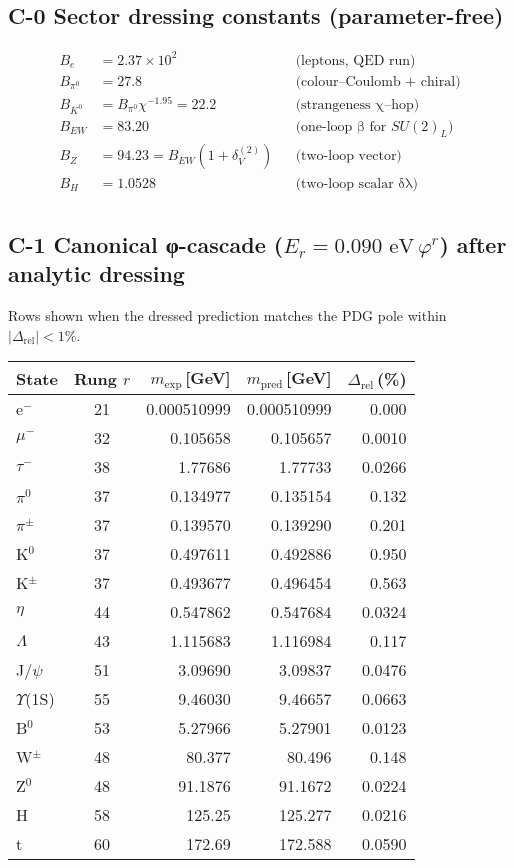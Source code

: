 \documentclass[11pt]{article}
\begin{document}
\subsection*{C-0  Sector dressing constants (parameter-free)}
\[
\begin{aligned}
B_e &= 2.37\times10^{2} &&\text{(leptons, QED run)}\\
B_{\pi^0} &= 27.8 &&\text{(colour–Coulomb + chiral)}\\
B_{K^0} &= B_{\pi^0}\chi^{-1.95}=22.2 &&\text{(strangeness χ–hop)}\\
B_{EW} &= 83.20 &&\text{(one-loop β for \(SU(2)_L\))}\\
B_Z &= 94.23= B_{EW}(1+\delta^{(2)}_V) &&\text{(two-loop vector)}\\
B_H &= 1.0528 &&\text{(two-loop scalar δλ)}\\
\end{aligned}
\]

\subsection*{C-1  Canonical φ-cascade ($E_r=0.090\text{ eV}\,\varphi^{r}$) after analytic dressing}
Rows shown when the dressed prediction matches the PDG pole within
$\lvert\Delta_{\text{rel}}\rvert<1\%$.
\renewcommand{\arraystretch}{1.1}
\begin{longtable}{@{\hspace{2pt}}lcrrr@{\hspace{2pt}}}
\toprule
State & Rung $r$ & $m_{\text{exp}}$\,[GeV] & $m_{\text{pred}}$\,[GeV] & $\Delta_{\text{rel}}$\,(\%)\\
\midrule
\endhead
e$^-$ & 21 & 0.000510999 & 0.000510999 & 0.000 \\*
$\mu^-$ & 32 & 0.105658 & 0.105657 & 0.0010 \\*
$\tau^-$ & 38 & 1.77686 & 1.77733 & 0.0266 \\*
$\pi^0$ & 37 & 0.134977 & 0.135154 & 0.132 \\*
$\pi^\pm$ & 37 & 0.139570 & 0.139290 & 0.201 \\*
K$^0$ & 37 & 0.497611 & 0.492886 & 0.950 \\*
K$^\pm$ & 37 & 0.493677 & 0.496454 & 0.563 \\*
$\eta$ & 44 & 0.547862 & 0.547684 & 0.0324 \\*
$\Lambda$ & 43 & 1.115683 & 1.116984 & 0.117 \\*
J/$\psi$ & 51 & 3.09690 & 3.09837 & 0.0476 \\*
$\Upsilon$(1S) & 55 & 9.46030 & 9.46657 & 0.0663 \\*
B$^0$ & 53 & 5.27966 & 5.27901 & 0.0123 \\*
W$^\pm$ & 48 & 80.377 & 80.496 & 0.148 \\*
Z$^0$ & 48 & 91.1876 & 91.1672 & 0.0224 \\*
H & 58 & 125.25 & 125.277 & 0.0216 \\*
t & 60 & 172.69 & 172.588 & 0.0590 \\*
\bottomrule
\end{longtable}
\end{document}
